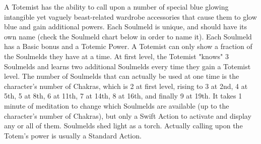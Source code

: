  A Totemist has the ability to call upon a number of special blue glowing intangible yet vaguely beast-related wardrobe accessories that cause them to glow blue and gain additional powers. Each Soulmeld is unique, and should have its own name (check the Soulmeld chart below in order to name it). Each Soulmeld has a Basic bonus and a Totemic Power. A Totemist can only show a fraction of the Soulmelds they have at a time. At first level, the Totemist "knows" 3 Soulmelds and learns two additional Soulmelds every time they gain a Totemist level. The number of Soulmelds that can actually be used at one time is the character's number of Chakras, which is 2 at first level, rising to 3 at 2nd, 4 at 5th, 5 at 8th, 6 at 11th, 7 at 14th, 8 at 16th, and finally 9 at 19th. It takes 1 minute of meditation to change which Soulmelds are available (up to the character's number of Chakras), but only a Swift Action to activate and display any or all of them. Soulmelds shed light as a torch. Actually calling upon the Totem's power is usually a Standard Action.




